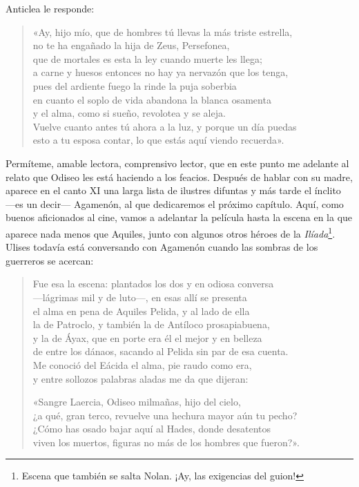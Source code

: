Anticlea le responde:

\begin{verse}
«Ay, hijo mío, que de hombres tú llevas la más triste estrella,\\
no te ha engañado la hija de Zeus, Persefonea,\\
que de mortales es esta la ley cuando muerte les llega;\\
a carne y huesos entonces no hay ya nervazón que los tenga,\\
pues del ardiente fuego la rinde la puja soberbia\\
en cuanto el soplo de vida abandona la blanca osamenta\\
y el alma, como si sueño, revolotea y se aleja.\\
Vuelve cuanto antes tú ahora a la luz, y porque un día puedas\\
esto a tu esposa contar, lo que estás aquí viendo recuerda».
\end{verse}

Permíteme, amable lectora, comprensivo lector, que en este punto me adelante al relato que Odiseo les está haciendo a los feacios. Después de hablar con su madre, aparece en el canto XI una larga lista de ilustres difuntas y más tarde el ínclito ---es un decir--- Agamenón, al que dedicaremos el próximo capítulo. Aquí, como buenos aficionados al cine, vamos a adelantar la película hasta la escena en la que aparece nada menos que Aquiles, junto con algunos otros héroes de la \emph{Ilíada}\footnote{Escena que también se salta Nolan. ¡Ay, las exigencias del guion!}. Ulises todavía está conversando con Agamenón cuando las sombras de los guerreros se acercan:

\begin{verse}
Fue esa la escena: plantados los dos y en odiosa conversa\\
---lágrimas mil y de luto---, en esas allí se presenta\\
el alma en pena de Aquiles Pelida, y al lado de ella\\
la de Patroclo, y también la de Antíloco prosapiabuena,\\
y la de Áyax, que en porte era él el mejor y en belleza\\
de entre los dánaos, sacando al Pelida sin par de esa cuenta.\\
Me conoció del Eácida el alma, pie raudo como era,\\
y entre sollozos palabras aladas me da que dijeran:

«Sangre Laercia, Odiseo milmañas, hijo del cielo,\\
¿a qué, gran terco, revuelve una hechura mayor aún tu pecho?\\
¿Cómo has osado bajar aquí al Hades, donde desatentos\\
viven los muertos, figuras no más de los hombres que fueron?».
\end{verse}

